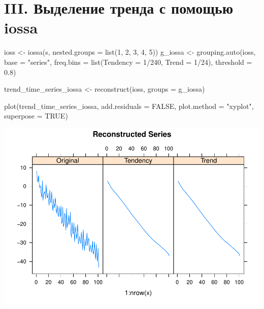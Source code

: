 \documentclass[specialist,
               substylefile = spbu_report.rtx,
               subf,href,colorlinks=true, 12pt]{disser}
\theoremstyle{definition}
\newenvironment{Shaded}{\begin{snugshade}}{\end{snugshade}}
\newcommand{\AttributeTok}[1]{\textcolor[rgb]{0.77,0.63,0.00}{#1}}
\newcommand{\ConstantTok}[1]{\textcolor[rgb]{0.00,0.00,0.00}{#1}}
\newcommand{\DecValTok}[1]{\textcolor[rgb]{0.00,0.00,0.81}{#1}}
\newcommand{\FloatTok}[1]{\textcolor[rgb]{0.00,0.00,0.81}{#1}}
\newcommand{\FunctionTok}[1]{\textcolor[rgb]{0.00,0.00,0.00}{#1}}
\newcommand{\NormalTok}[1]{#1}
\newcommand{\OtherTok}[1]{\textcolor[rgb]{0.56,0.35,0.01}{#1}}
\newcommand{\SpecialCharTok}[1]{\textcolor[rgb]{0.00,0.00,0.00}{#1}}
\newcommand{\StringTok}[1]{\textcolor[rgb]{0.31,0.60,0.02}{#1}}
\begin{document}
\hypertarget{iii.-ux432ux44bux434ux435ux43bux435ux43dux438ux435-ux442ux440ux435ux43dux434ux430-ux441-ux43fux43eux43cux43eux449ux44cux44e-iossa}{%
\section{III. Выделение тренда с помощью
iossa}\label{iii.-ux432ux44bux434ux435ux43bux435ux43dux438ux435-ux442ux440ux435ux43dux434ux430-ux441-ux43fux43eux43cux43eux449ux44cux44e-iossa}}

\begin{Shaded}
\begin{Highlighting}[]
\NormalTok{  ioss }\OtherTok{\textless{}{-}} \FunctionTok{iossa}\NormalTok{(s, }\AttributeTok{nested.groups =} \FunctionTok{list}\NormalTok{(}\DecValTok{1}\NormalTok{, }\DecValTok{2}\NormalTok{, }\DecValTok{3}\NormalTok{, }\DecValTok{4}\NormalTok{, }\DecValTok{5}\NormalTok{))}
\NormalTok{  g\_iossa }\OtherTok{\textless{}{-}} \FunctionTok{grouping.auto}\NormalTok{(ioss, }\AttributeTok{base =} \StringTok{"series"}\NormalTok{, }
                 \AttributeTok{freq.bins =} \FunctionTok{list}\NormalTok{(}\AttributeTok{Tendency =} \DecValTok{1}\SpecialCharTok{/}\DecValTok{240}\NormalTok{, }\AttributeTok{Trend =} \DecValTok{1}\SpecialCharTok{/}\DecValTok{24}\NormalTok{), }
                 \AttributeTok{threshold =} \FloatTok{0.8}\NormalTok{)}
                 
\NormalTok{  trend\_time\_series\_iossa }\OtherTok{\textless{}{-}} \FunctionTok{reconstruct}\NormalTok{(ioss, }\AttributeTok{groups =}\NormalTok{ g\_iossa)}
  
  \FunctionTok{plot}\NormalTok{(trend\_time\_series\_iossa, }
   \AttributeTok{add.residuals =} \ConstantTok{FALSE}\NormalTok{, }
   \AttributeTok{plot.method =} \StringTok{"xyplot"}\NormalTok{, }\AttributeTok{superpose =} \ConstantTok{TRUE}\NormalTok{)}
\end{Highlighting}
\end{Shaded}

\includegraphics{iossa_example2/iossa_trend-1.pdf}
\end{document}
